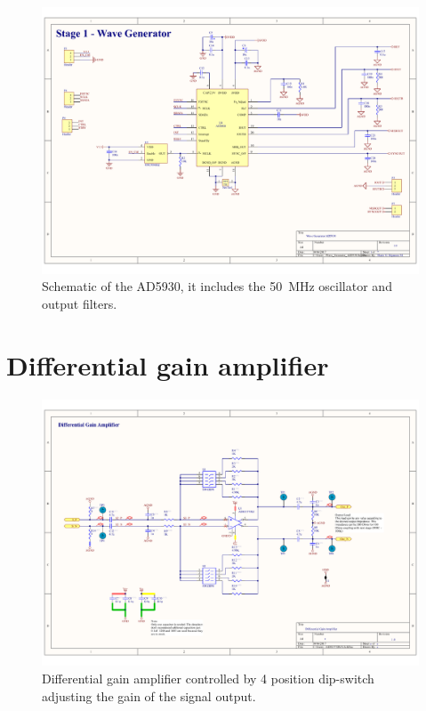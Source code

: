 \begin{landscape}
	\begin{figure}[!htpb]
		\centering
		\includegraphics[width=0.9\paperwidth,keepaspectratio]{DDS}
		\caption[Direct digital synthesis circuit schematic]{Schematic of the AD5930, it includes the \SI{50}{\mega\hertz} oscillator and output filters.}
		\label{fig:DDS}
	\end{figure}
\end{landscape}

\section*{Differential gain amplifier}
\label{Appendix: DGA}
\begin{figure}[!htpb]
	\centering
	\includegraphics[width=0.9\paperwidth,keepaspectratio,angle=90]{DGA}
	\caption[Schematic of the differential gain amplifier circuit]{Differential gain amplifier controlled by 4 position dip-switch adjusting the gain of the signal output.}
	\label{fig:DGA}
\end{figure}


